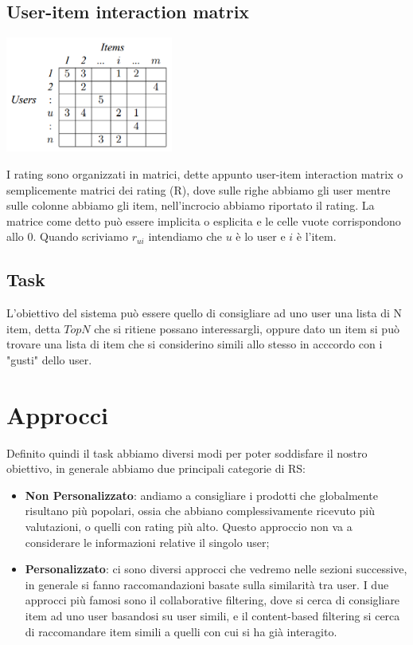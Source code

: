 \subsection{User-item interaction matrix}
\begin{minipage}[H]{0.40\textwidth}
	\begin{center}
		\includegraphics[width=5.5cm]{figures/Sample-of-user-item-matrix}
		\label{tab:user_item_matrix}
	\end{center}
\end{minipage}
\begin{minipage}[H]{0.55\textwidth}
	I rating sono organizzati in matrici, dette appunto user-item interaction matrix o semplicemente matrici dei rating (R), dove sulle righe abbiamo gli user mentre sulle colonne abbiamo gli item, nell'incrocio abbiamo riportato il rating. 
	La matrice come detto può essere implicita o esplicita e le celle vuote corrispondono allo 0.
	Quando scriviamo $r_{ui}$ intendiamo che $u$ è lo user e $i$ è l'item.
\end{minipage}

\subsection{Task}
L'obiettivo del sistema può essere quello di consigliare ad uno user una lista di N item, detta \textbf{$TopN$} che si ritiene possano interessargli, oppure dato un item si può trovare una lista di item che si considerino simili allo stesso in acccordo con i "gusti" dello user.

\section{Approcci}
Definito quindi il task abbiamo diversi modi per poter soddisfare il nostro obiettivo, in generale abbiamo due principali categorie di RS:
\begin{itemize}
	\item \textbf{Non Personalizzato}: andiamo a consigliare i prodotti che globalmente risultano più popolari, ossia che abbiano complessivamente ricevuto più valutazioni, o quelli con rating più alto. Questo approccio non va a considerare le informazioni relative il singolo user;
	\item \textbf{Personalizzato}: ci sono diversi approcci che vedremo nelle sezioni successive, in generale si fanno raccomandazioni basate sulla similarità tra user. I due approcci più famosi sono il collaborative filtering, dove si cerca di consigliare item ad uno user basandosi su user simili, e il content-based filtering si cerca di raccomandare item simili a quelli con cui si ha già interagito.
\end{itemize}

